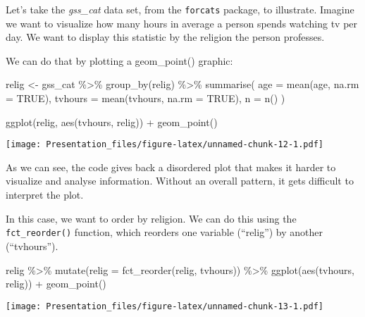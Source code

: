 \documentclass[
]{article}
\newenvironment{Shaded}{\begin{snugshade}}{\end{snugshade}}
\newcommand{\AttributeTok}[1]{\textcolor[rgb]{0.77,0.63,0.00}{#1}}
\newcommand{\ConstantTok}[1]{\textcolor[rgb]{0.00,0.00,0.00}{#1}}
\newcommand{\FunctionTok}[1]{\textcolor[rgb]{0.00,0.00,0.00}{#1}}
\newcommand{\NormalTok}[1]{#1}
\newcommand{\OtherTok}[1]{\textcolor[rgb]{0.56,0.35,0.01}{#1}}
\newcommand{\SpecialCharTok}[1]{\textcolor[rgb]{0.00,0.00,0.00}{#1}}
\begin{document}
Let's take the \emph{gss\_cat} data set, from the \texttt{forcats}
package, to illustrate. Imagine we want to visualize how many hours in
average a person spends watching tv per day. We want to display this
statistic by the religion the person professes.

We can do that by plotting a geom\_point() graphic:

\begin{Shaded}
\begin{Highlighting}[]
\NormalTok{relig }\OtherTok{\textless{}{-}}\NormalTok{ gss\_cat }\SpecialCharTok{\%\textgreater{}\%}
  \FunctionTok{group\_by}\NormalTok{(relig) }\SpecialCharTok{\%\textgreater{}\%}
  \FunctionTok{summarise}\NormalTok{(}
    \AttributeTok{age =} \FunctionTok{mean}\NormalTok{(age, }\AttributeTok{na.rm =} \ConstantTok{TRUE}\NormalTok{),}
    \AttributeTok{tvhours =} \FunctionTok{mean}\NormalTok{(tvhours, }\AttributeTok{na.rm =} \ConstantTok{TRUE}\NormalTok{),}
    \AttributeTok{n =} \FunctionTok{n}\NormalTok{()}
\NormalTok{  )}

\FunctionTok{ggplot}\NormalTok{(relig, }\FunctionTok{aes}\NormalTok{(tvhours, relig)) }\SpecialCharTok{+} \FunctionTok{geom\_point}\NormalTok{()}
\end{Highlighting}
\end{Shaded}

\texttt{[image: Presentation\_files/figure-latex/unnamed-chunk-12-1.pdf]}

As we can see, the code gives back a disordered plot that makes it
harder to visualize and analyse information. Without an overall pattern,
it gets difficult to interpret the plot.

In this case, we want to order by religion. We can do this using the
\texttt{fct\_reorder()} function, which reorders one variable
(``relig'') by another (``tvhours'').

\begin{Shaded}
\begin{Highlighting}[]
\NormalTok{relig }\SpecialCharTok{\%\textgreater{}\%}
  \FunctionTok{mutate}\NormalTok{(}\AttributeTok{relig =} \FunctionTok{fct\_reorder}\NormalTok{(relig, tvhours)) }\SpecialCharTok{\%\textgreater{}\%}
  \FunctionTok{ggplot}\NormalTok{(}\FunctionTok{aes}\NormalTok{(tvhours, relig)) }\SpecialCharTok{+}
    \FunctionTok{geom\_point}\NormalTok{()}
\end{Highlighting}
\end{Shaded}

\texttt{[image: Presentation\_files/figure-latex/unnamed-chunk-13-1.pdf]}
\end{document}
